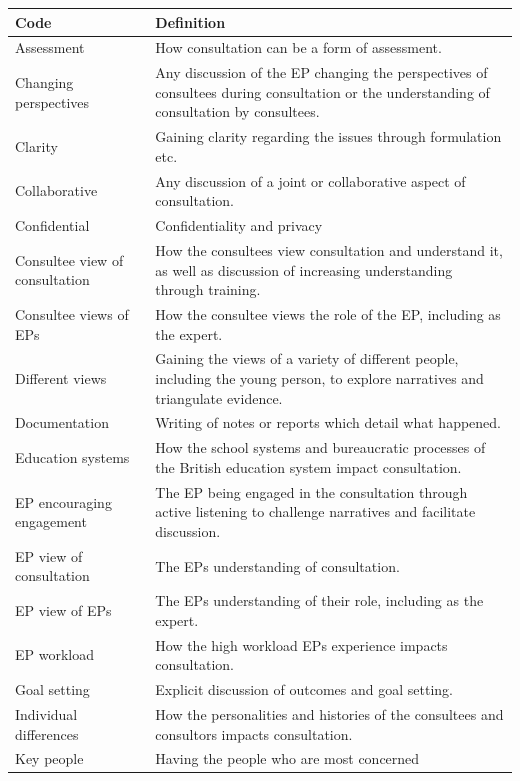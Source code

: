 \documentclass[
  english,
  man,floatsintext]{apa6}
\begin{document}
\begin{longtable}[]{@{}
  >{\raggedright\arraybackslash}p{}
  >{\raggedright\arraybackslash}p{}@{}}
\toprule
Code & Definition \\
\midrule
\endhead
Assessment & How consultation can be a form of
assessment. \\
Changing perspectives & Any discussion of the EP changing the
perspectives of consultees during
consultation or the understanding of
consultation by consultees. \\
Clarity & Gaining clarity regarding the issues
through formulation etc. \\
Collaborative & Any discussion of a joint or collaborative
aspect of consultation. \\
Confidential & Confidentiality and privacy \\
Consultee view of
consultation & How the consultees view consultation and
understand it, as well as discussion of
increasing understanding through training. \\
Consultee views of EPs & How the consultee views the role of the EP,
including as the expert. \\
Different views & Gaining the views of a variety of different
people, including the young person, to
explore narratives and triangulate
evidence. \\
Documentation & Writing of notes or reports which detail
what happened. \\
Education systems & How the school systems and bureaucratic
processes of the British education system
impact consultation. \\
EP encouraging
engagement & The EP being engaged in the consultation
through active listening to challenge
narratives and facilitate discussion. \\
EP view of
consultation & The EPs understanding of consultation. \\
EP view of EPs & The EPs understanding of their role,
including as the expert. \\
EP workload & How the high workload EPs experience
impacts consultation. \\
Goal setting & Explicit discussion of outcomes and goal
setting. \\
Individual differences & How the personalities and histories of the
consultees and consultors impacts
consultation. \\
Key people & Having the people who are most concerned

\end{longtable}
\end{document}
